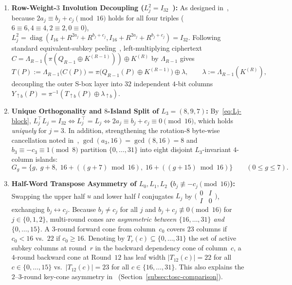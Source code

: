\documentclass[11pt,a4paper]{article}
\theoremstyle{definition}
\theoremstyle{remark}
\begin{document}
\begin{enumerate}[label=(II.\arabic*),leftmargin=2.2em,nosep]
    \item \textbf{Row-Weight-$3$ Involution Decoupling ($L_j^2 = I_{32}$~\cite{GMW24}):} As designed in~\cite[Section~3.1, p.~5]{GMW24}, because $2a_j \equiv b_j + c_j \pmod{16}$ holds for all four triples ($6\equiv 6, 4\equiv 4, 2\equiv 2, 0\equiv 0$), $L_j^2 = \operatorname{diag}(I_{16}+R^{2a_j}+R^{b_j+c_j}, I_{16}+R^{2a_j}+R^{b_j+c_j}) = I_{32}$. Following standard equivalent-subkey peeling~\cite{BRRT25,BBGHP25,DG25}, left-multiplying ciphertext $C = \Lambda_{R-1}(\pi(Q_{R-1}\oplus K^{(R-1)})) \oplus K^{(R)}$ by $\Lambda_{R-1}$ gives
    \begin{equation}
    \label{eq:peel}
    T(P) := \Lambda_{R-1}\bigl(C(P)\bigr) = \pi\bigl(Q_{R-1}(P) \oplus K^{(R-1)}\bigr) \oplus \lambda, \qquad \lambda := \Lambda_{R-1}(K^{(R)}),
    \end{equation}
    decoupling the outer S-box layer into $32$ independent $4$-bit columns $Y_{\uparrow b}(P) = \pi^{-1}(T_{\uparrow b}(P) \oplus \lambda_{\uparrow b})$.
    \item \textbf{Unique Orthogonality and $8$-Island Split of $L_3 = (8,9,7)$:} By~\eqref{eq:Lj-block}, $L_j^\top L_j = I_{32} \iff L_j^\top = L_j \iff 2a_j \equiv b_j + c_j \equiv 0 \pmod{16}$, which holds \emph{uniquely} for $j = 3$. In addition, strengthening the rotation-$8$ byte-wise cancellation noted in~\cite{BFG24,KKL24}, $\gcd(a_3, 16) = \gcd(8, 16) = 8$ and $b_3 \equiv -c_3 \equiv 1 \pmod 8$ partition $\{0,\dots,31\}$ into eight disjoint $L_3$-invariant $4$-column islands:
    \begin{equation}
    \label{eq:islands}
    G_g = \bigl\{g,\; g+8,\; 16 + ((g+7)\bmod 16),\; 16 + ((g+15)\bmod 16)\bigr\} \qquad (0 \le g \le 7).
    \end{equation}
    \item \textbf{Half-Word Transpose Asymmetry of $L_0, L_1, L_2$ ($b_j \not\equiv -c_j \pmod{16}$):} Swapping the upper half $u$ and lower half $l$ conjugates $L_j$ by $\bigl(\begin{smallmatrix}0 & I\\ I & 0\end{smallmatrix}\bigr)$, exchanging $b_j \leftrightarrow c_j$. Because $b_j \neq c_j$ for all $j$ and $b_j + c_j \not\equiv 0 \pmod{16}$ for $j \in \{0,1,2\}$, multi-round cones are \emph{asymmetric between $\{16,\dots,31\}$ and $\{0,\dots,15\}$}. A $3$-round forward cone from column~$c_0$ covers $23$ columns if $c_0 < 16$ vs.\ $22$ if $c_0 \ge 16$. Denoting by $T_r(c) \subseteq \{0,\dots,31\}$ the set of active subkey columns at round~$r$ in the backward dependency cone of column~$c$, a $4$-round backward cone at Round~$12$ has leaf width $|T_{12}(c)| = 22$ for all $c \in \{0,\dots,15\}$ vs.\ $|T_{12}(c)| = 23$ for all $c \in \{16,\dots,31\}$. This also explains the $2$--$3$-round key-cone asymmetry in~\cite[$\S$5.1, Table~5]{BNS26} (Section~\ref{subsec:tosc-comparison}).
\end{enumerate}
\end{document}
